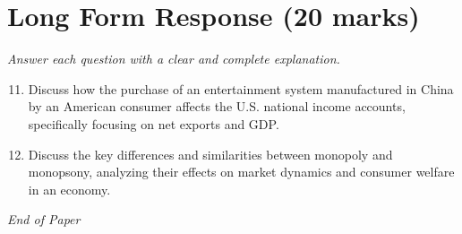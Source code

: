 \documentclass[12pt]{article}
\begin{document}
\section*{Long Form Response (20 marks)}
\textit{Answer each question with a clear and complete explanation.}
\begin{enumerate}[label=\arabic*.]
\setcounter{enumi}{10}
\item Discuss how the purchase of an entertainment system manufactured in China by an American consumer affects the U.S. national income accounts, specifically focusing on net exports and GDP.
\item Discuss the key differences and similarities between monopoly and monopsony, analyzing their effects on market dynamics and consumer welfare in an economy.
\end{enumerate}

\vfill
\noindent\textit{End of Paper}
\end{document}
